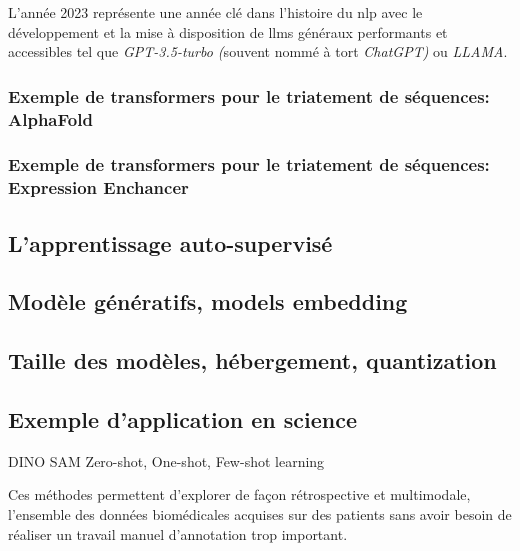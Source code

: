 L’année 2023 représente une année clé dans l’histoire du \gls{nlp} avec le développement et la mise à disposition de \gls{llms} généraux performants et accessibles tel que \textit{GPT-3.5-turbo (}souvent nommé à tort \textit{ChatGPT)} ou \textit{LLAMA}. 


\subsubsection{Exemple de transformers pour le triatement de séquences: AlphaFold}
\subsubsection{Exemple de transformers pour le triatement de séquences: Expression Enchancer}
\subsection{L'apprentissage auto-supervisé}
\subsection{Modèle génératifs, models embedding}
\subsection{Taille des modèles, hébergement, quantization}
\subsection{Exemple d'application en science}
DINO
SAM
Zero-shot, One-shot, Few-shot learning



Ces méthodes permettent d’explorer de façon rétrospective et multimodale, l’ensemble des données biomédicales acquises sur des patients sans avoir besoin de réaliser un travail manuel d’annotation trop important.